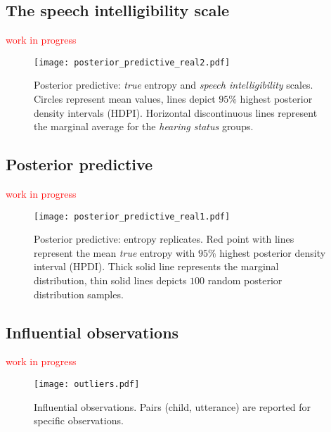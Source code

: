 \subsection{The speech intelligibility scale} \label{sS:results_scales}
%
\textcolor{red}{work in progress}
%
\begin{figure}[!h]
	\centering
	\texttt{[image: posterior\_predictive\_real2.pdf]}
	\caption[Posterior predictive: \textit{true} entropy and \textit{speech intelligibility} scales]{Posterior predictive: \textit{true} entropy and \textit{speech intelligibility} scales. Circles represent mean values, lines depict $95\%$ highest posterior density intervals (HDPI). Horizontal discontinuous lines represent the marginal average for the \textit{hearing status} groups.}
	\label{fig:predictive2}
\end{figure}
%
%
\subsection{Posterior predictive} \label{sS:results_posterior}
%
\textcolor{red}{work in progress}
%
\begin{figure}[!h]
	\centering
	\texttt{[image: posterior\_predictive\_real1.pdf]}
	\caption[Posterior predictive: entropy replicates]{Posterior predictive: entropy replicates. Red point with lines represent the mean \textit{true} entropy with $95\%$ highest posterior density interval (HPDI). Thick solid line represents the marginal distribution, thin solid lines depicts $100$ random posterior distribution samples.}
	\label{fig:predictive1}
\end{figure}
%
%
\subsection{Influential observations} \label{sS:results_outliers}
%
\textcolor{red}{work in progress}
%
\begin{figure}[!h]
	\centering
	\texttt{[image: outliers.pdf]}
	\caption[Influential observations]{Influential observations. Pairs (child, utterance) are reported for specific observations.}
	\label{fig:outliers}
\end{figure}
%
%